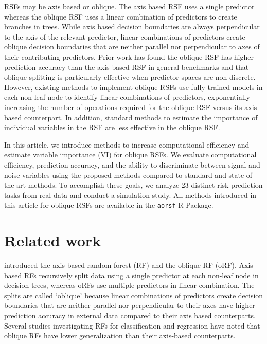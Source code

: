 \documentclass[twoside,11pt]{article}\usepackage[]{graphicx}\usepackage[]{color}
\begin{document}
RSFs may be axis based or oblique. The axis based RSF uses a single predictor whereas the oblique RSF uses a linear combination of predictors to create branches in trees. While axis based decision boundaries are always perpendicular to the axis of the relevant predictor, linear combinations of predictors create oblique decision boundaries that are neither parallel nor perpendicular to axes of their contributing predictors. Prior work has found the oblique RSF has higher prediction accuracy than the axis based RSF in general benchmarks \citep{jaeger2019oblique} and that oblique splitting is particularly effective when predictor spaces are non-discrete. However, existing methods to implement oblique RSFs use fully trained models in each non-leaf node to identify linear combinations of predictors, exponentially increasing the number of operations required for the oblique RSF versus its axis based counterpart. In addition, standard methods to estimate the importance of individual variables in the RSF are less effective in the oblique RSF.

In this article, we introduce methods to increase computational efficiency and estimate variable importance (VI) for oblique RSFs. We evaluate computational efficiency, prediction accuracy, and the ability to discriminate between signal and noise variables using the proposed methods compared to standard and state-of-the-art methods. To accomplish these goals, we analyze 23 distinct risk prediction tasks from real data and conduct a simulation study. All methods introduced in this article for oblique RSFs are available in the \texttt{aorsf} R Package.


\section{Related work}


\citet{breiman2001random} introduced the axis-based random forest (RF) and the oblique RF (oRF). Axis based RFs recursively split data using a single predictor at each non-leaf node in decision trees, whereas oRFs use multiple predictors in linear combination. The splits are called `oblique' because linear combinations of predictors create decision boundaries that are neither parallel nor perpendicular to their axes have higher prediction accuracy in external data compared to their axis based counterparts. Several studies investigating RFs for classification and regression have noted that oblique RFs have lower generalization than their axis-based counterparts.
\end{document}
